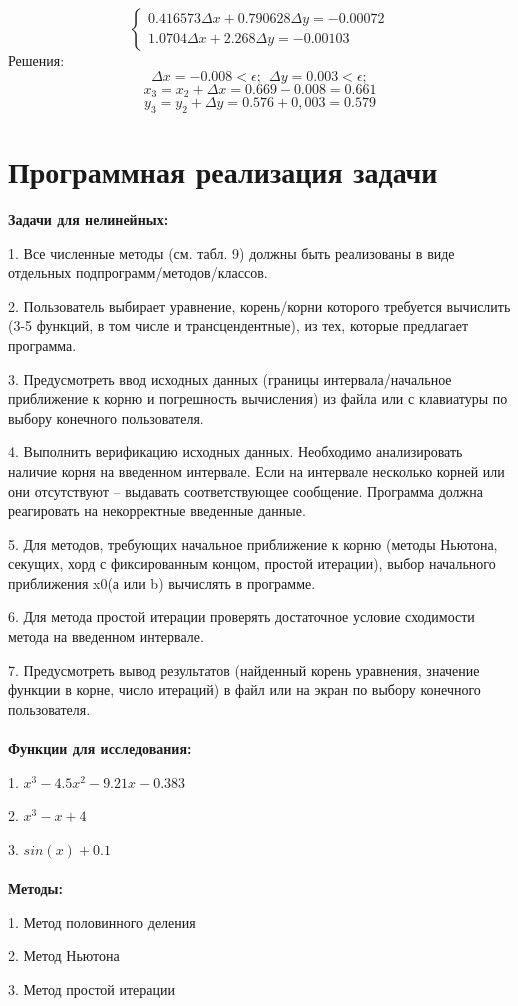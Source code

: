 \documentclass{article}
\begin{document}
\[\begin{cases}
    0.416573\Delta x +0.790628\Delta y = -0.00072\\
    1.0704\Delta x + 2.268\Delta y = -0.00103
\end{cases} 
\]
Решения:
\[\Delta x = -0.008 < \epsilon; \ \ 
\Delta y = 0.003 < \epsilon;
\]
\[x_3 = x_2 + \Delta x = 0.669 - 0.008 = 0.661\]
\[y_3 = y_2 + \Delta y = 0.576 + 0,003 = 0.579\]

\section{Программная реализация задачи}
\textbf{Задачи для нелинейных:}

1. Все численные методы (см. табл. 9) должны быть реализованы в виде отдельных подпрограмм/методов/классов.

2. Пользователь выбирает уравнение, корень/корни которого требуется вычислить (3-5 функций, в том числе и трансцендентные), из тех, которые предлагает программа.

3. Предусмотреть ввод исходных данных (границы интервала/начальное приближение к корню и погрешность вычисления) из файла или с клавиатуры по
выбору конечного пользователя.

4. Выполнить верификацию исходных данных. Необходимо анализировать наличие корня на введенном интервале. Если на интервале несколько корней или
они отсутствуют – выдавать соответствующее сообщение. Программа должна
реагировать на некорректные введенные данные.

5. Для методов, требующих начальное приближение к корню (методы Ньютона,
секущих, хорд с фиксированным концом, простой итерации), выбор начального приближения x0(а или b) вычислять в программе.

6. Для метода простой итерации проверять достаточное условие сходимости метода на введенном интервале.

7. Предусмотреть вывод результатов (найденный корень уравнения, значение
функции в корне, число итераций) в файл или на экран по выбору конечного
пользователя.
\\ \\
\textbf{Функции для исследования: }

1. $x^3 - 4.5x^2 - 9.21x - 0.383$

2. $x^3 - x + 4$

3. $sin(x) + 0.1$
\\ \\
\textbf{Методы: }

1. Метод половинного деления

2. Метод Ньютона

3. Метод простой итерации
\end{document}

